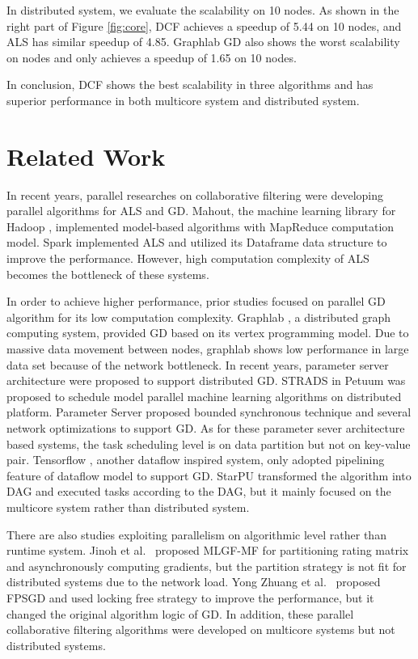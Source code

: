 \documentclass{llncs}
\begin{document}
In distributed system, we evaluate the scalability on 10 nodes. As shown in the right part of Figure \ref{fig:core}, DCF achieves a speedup of 5.44 on 10 nodes, and ALS has similar speedup of 4.85. Graphlab GD also shows the worst scalability on nodes and only achieves a speedup of 1.65 on 10 nodes.

In conclusion, DCF shows the best scalability in three algorithms and has superior performance in both multicore system and distributed system.

\vspace{-15pt}
\section{Related Work}
\label{sec:relatedWork}
\vspace{-10pt}
In recent years, parallel researches on collaborative filtering were developing parallel algorithms for ALS and GD. Mahout, the machine learning library for Hadoop \cite{Hadoop}, implemented model-based algorithms with MapReduce \cite{MapReduce} computation model. Spark \cite{SparkMllib} implemented ALS \cite{SparkCF} and utilized its Dataframe \cite{dataFrame}  data structure to improve the performance. However, high computation complexity of ALS becomes the bottleneck of these systems.

In order to achieve higher performance, prior studies focused on parallel GD algorithm for its low computation complexity. Graphlab \cite{graphlab}, a distributed graph computing system, provided GD based on its vertex programming model. Due to massive data movement between nodes, graphlab shows low performance in large data set because of the network bottleneck.
In recent years, parameter server architecture were proposed to support distributed GD. STRADS \cite{strads} in Petuum was proposed to schedule model parallel machine learning algorithms on distributed platform. Parameter Server \cite{ps} proposed bounded synchronous technique and several network optimizations to support GD. As for these parameter sever architecture based systems, the task scheduling level is on data partition but not on key-value pair. Tensorflow \cite{tensorflow}, another dataflow inspired system, only adopted pipelining feature of dataflow model to support GD. StarPU \cite{StarPU} transformed the algorithm into DAG and executed tasks according to the DAG, but it mainly focused on the multicore system rather than distributed system.

There are also studies exploiting parallelism on algorithmic level rather than runtime system. Jinoh et al.~\cite{sgdKdd2015} proposed MLGF-MF for partitioning rating matrix and asynchronously computing gradients, but the partition strategy is not fit for distributed systems due to the network load. Yong Zhuang et al.~\cite{sgdFast2015} proposed FPSGD and used locking free strategy to improve the performance, but it changed the original algorithm logic of GD. In addition, these parallel collaborative filtering algorithms were developed on multicore systems but not distributed systems.
\end{document}
